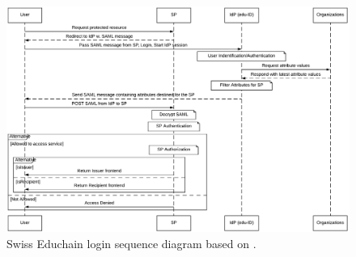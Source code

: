 \begin{figure}[h]
	\centering
	\includegraphics[width=\textwidth]{figs/ch4/login-sequence}
	\caption{Swiss Educhain login sequence diagram based on \cite{shib-logins}.}
	\label{fig:login-sequence}
\end{figure}

